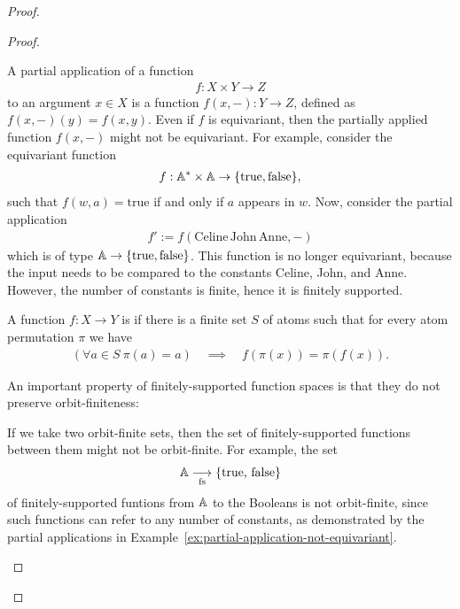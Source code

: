 \begin{proof}
\begin{proof}
        \begin{myexample}
        \label{ex:partial-application-not-equivariant}
        A partial application of a function 
        \begin{align*}
        f : X \times Y \to Z
        \end{align*}
        to an argument $x \in X$ is a function $f(x, -) : Y \to Z$, defined as $f(x, -)(y) = f(x,y)$. Even if $f$ is equivariant, then the  partially applied function $f(x, -)$ might not be equivariant. For example, consider the equivariant function
        \begin{align*}
        f: {\mathbb A^* \times \mathbb A} \to  {\{\textrm{true}, \textrm{false}\}},
        \end{align*}
        such that $f(w, a) = \textrm{true}$ if and only if $a$ appears in $w$. Now, consider the partial application
        \begin{align*}
        f' := f(\textrm{Celine}\, \textrm{John}\, \textrm{Anne}, -)
        \end{align*}
        which is of type $\mathbb A \to \{\textrm{true}, \textrm{false}\}$. This function is no longer equivariant, because the input needs to be compared to the constants Celine, John, and Anne. However, the number of constants is finite, hence it is finitely supported.
      \end{myexample}
      \begin{definition} 
        \label{def:finitely-supported-function}
        \AP
         A function $f : X \to Y$ is  if there is a finite set $S$ of atoms such that for every atom permutation $\pi$ we have 
        \begin{align*}
            (\forall a \in S\ \pi(a)=a) 
            \quad \implies \quad f(\pi(x)) = \pi(f(x)).
        \end{align*}
      \end{definition}
      An important property of finitely-supported function spaces is that they do not preserve orbit-finiteness: 

      \begin{myexample} If we take two orbit-finite sets, then the set of finitely-supported functions between them might not be orbit-finite. For example, the set
        \begin{align*}
        \mathbb A \underset{\text{fs}}{\longrightarrow} \{\text{true, false}\}
        \end{align*}
        of finitely-supported funtions from $\mathbb A$ to the Booleans  is not orbit-finite, since such functions can refer to any number of constants, as demonstrated by the partial applications in Example~\ref{ex:partial-application-not-equivariant}.
      \end{myexample}


\end{proof}
\end{proof}
